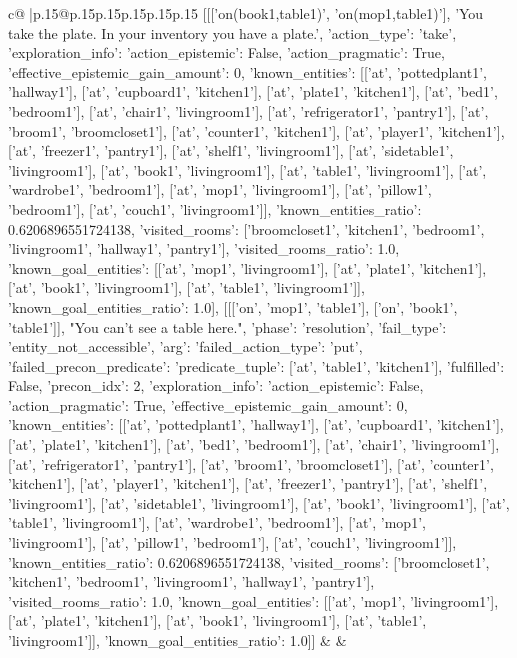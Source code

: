 \documentclass{article}
\begin{document}
{\begin{supertabular}{c@{$\;$}|p{.15\linewidth}@{}p{.15\linewidth}p{.15\linewidth}p{.15\linewidth}p{.15\linewidth}p{.15\linewidth}}
{{{	 [[['on(book1,table1)', 'on(mop1,table1)'], 'You take the plate. In your inventory you have a plate.', {'action_type': 'take', 'exploration_info': {'action_epistemic': False, 'action_pragmatic': True, 'effective_epistemic_gain_amount': 0, 'known_entities': [['at', 'pottedplant1', 'hallway1'], ['at', 'cupboard1', 'kitchen1'], ['at', 'plate1', 'kitchen1'], ['at', 'bed1', 'bedroom1'], ['at', 'chair1', 'livingroom1'], ['at', 'refrigerator1', 'pantry1'], ['at', 'broom1', 'broomcloset1'], ['at', 'counter1', 'kitchen1'], ['at', 'player1', 'kitchen1'], ['at', 'freezer1', 'pantry1'], ['at', 'shelf1', 'livingroom1'], ['at', 'sidetable1', 'livingroom1'], ['at', 'book1', 'livingroom1'], ['at', 'table1', 'livingroom1'], ['at', 'wardrobe1', 'bedroom1'], ['at', 'mop1', 'livingroom1'], ['at', 'pillow1', 'bedroom1'], ['at', 'couch1', 'livingroom1']], 'known_entities_ratio': 0.6206896551724138, 'visited_rooms': ['broomcloset1', 'kitchen1', 'bedroom1', 'livingroom1', 'hallway1', 'pantry1'], 'visited_rooms_ratio': 1.0, 'known_goal_entities': [['at', 'mop1', 'livingroom1'], ['at', 'plate1', 'kitchen1'], ['at', 'book1', 'livingroom1'], ['at', 'table1', 'livingroom1']], 'known_goal_entities_ratio': 1.0}}], [[['on', 'mop1', 'table1'], ['on', 'book1', 'table1']], "You can't see a table here.", {'phase': 'resolution', 'fail_type': 'entity_not_accessible', 'arg': {'failed_action_type': 'put', 'failed_precon_predicate': {'predicate_tuple': ['at', 'table1', 'kitchen1'], 'fulfilled': False, 'precon_idx': 2}}, 'exploration_info': {'action_epistemic': False, 'action_pragmatic': True, 'effective_epistemic_gain_amount': 0, 'known_entities': [['at', 'pottedplant1', 'hallway1'], ['at', 'cupboard1', 'kitchen1'], ['at', 'plate1', 'kitchen1'], ['at', 'bed1', 'bedroom1'], ['at', 'chair1', 'livingroom1'], ['at', 'refrigerator1', 'pantry1'], ['at', 'broom1', 'broomcloset1'], ['at', 'counter1', 'kitchen1'], ['at', 'player1', 'kitchen1'], ['at', 'freezer1', 'pantry1'], ['at', 'shelf1', 'livingroom1'], ['at', 'sidetable1', 'livingroom1'], ['at', 'book1', 'livingroom1'], ['at', 'table1', 'livingroom1'], ['at', 'wardrobe1', 'bedroom1'], ['at', 'mop1', 'livingroom1'], ['at', 'pillow1', 'bedroom1'], ['at', 'couch1', 'livingroom1']], 'known_entities_ratio': 0.6206896551724138, 'visited_rooms': ['broomcloset1', 'kitchen1', 'bedroom1', 'livingroom1', 'hallway1', 'pantry1'], 'visited_rooms_ratio': 1.0, 'known_goal_entities': [['at', 'mop1', 'livingroom1'], ['at', 'plate1', 'kitchen1'], ['at', 'book1', 'livingroom1'], ['at', 'table1', 'livingroom1']], 'known_goal_entities_ratio': 1.0}}]] 
	  } 
	   } 
	   } 
	 & & \\ 
 


\end{supertabular}}
\end{document}
